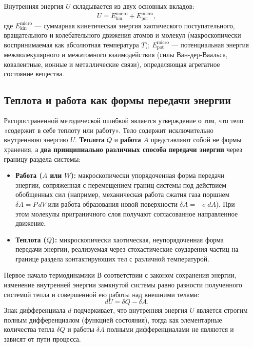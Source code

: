 \documentclass[12pt,a4paper]{article}
\begin{document}
Внутренняя энергия $U$ складывается из двух основных вкладов:
\begin{equation}
U = E_{\mathrm{kin}}^{\mathrm{micro}} + E_{\mathrm{pot}}^{\mathrm{micro}},
\label{eq:internal_energy}
\end{equation}
где $E_{\mathrm{kin}}^{\mathrm{micro}}$ --- суммарная кинетическая энергия хаотического поступательного, вращательного и колебательного движения атомов и молекул (макроскопически воспринимаемая как абсолютная температура $T$); $E_{\mathrm{pot}}^{\mathrm{micro}}$ --- потенциальная энергия межмолекулярного и межатомного взаимодействия (силы Ван-дер-Ваальса, ковалентные, ионные и металлические связи), определяющая агрегатное состояние вещества.

\subsection{Теплота и работа как формы передачи энергии}
Распространенной методической ошибкой является утверждение о том, что тело «содержит в себе теплоту или работу». Тело содержит исключительно внутреннюю энергию $U$. \textbf{Теплота} $Q$ и \textbf{работа} $A$ представляют собой не формы хранения, а \textbf{два принципиально различных способа передачи энергии} через границу раздела системы:
\begin{itemize}
    \item \textbf{Работа ($A$ или $W$):} макроскопически упорядоченная форма передачи энергии, сопряженная с перемещением границ системы под действием обобщенных сил (например, механическая работа сжатия газа поршнем $\delta A = P\,dV$ или работа образования новой поверхности $\delta A = -\sigma\,dA$). При этом молекулы приграничного слоя получают согласованное направленное движение.
    \item \textbf{Теплота ($Q$):} микроскопически хаотическая, неупорядоченная форма передачи энергии, реализуемая через стохастические соударения частиц на границе раздела контактирующих тел с различной температурой.
\end{itemize}

\begin{lawbox}{Первое начало термодинамики}
В соответствии с законом сохранения энергии, изменение внутренней энергии замкнутой системы равно разности полученного системой тепла и совершенной ею работы над внешними телами:
\begin{equation}
dU = \delta Q - \delta A.
\label{eq:first_law}
\end{equation}
Знак дифференциала $d$ подчеркивает, что внутренняя энергия $U$ является строгим полным дифференциалом (функцией состояния), тогда как элементарные количества тепла $\delta Q$ и работы $\delta A$ полными дифференциалами не являются и зависят от пути процесса.
\end{lawbox}
\end{document}
